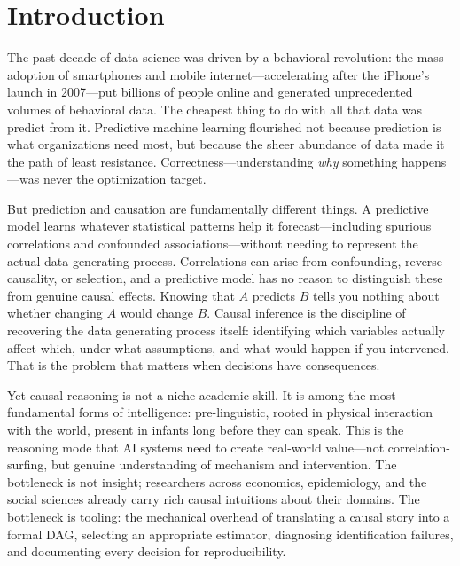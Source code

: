 \documentclass{article}
\begin{document}
\section{Introduction}
\label{sec:intro}

The past decade of data science was driven by a behavioral revolution: the mass adoption of smartphones and mobile internet---accelerating after the iPhone's launch in 2007---put billions of people online and generated unprecedented volumes of behavioral data. The cheapest thing to do with all that data was predict from it. Predictive machine learning flourished not because prediction is what organizations need most, but because the sheer abundance of data made it the path of least resistance. Correctness---understanding \emph{why} something happens---was never the optimization target.

But prediction and causation are fundamentally different things. A predictive model learns whatever statistical patterns help it forecast---including spurious correlations and confounded associations---without needing to represent the actual data generating process. Correlations can arise from confounding, reverse causality, or selection, and a predictive model has no reason to distinguish these from genuine causal effects. Knowing that $A$ predicts $B$ tells you nothing about whether changing $A$ would change $B$. Causal inference is the discipline of recovering the data generating process itself: identifying which variables actually affect which, under what assumptions, and what would happen if you intervened. That is the problem that matters when decisions have consequences.

Yet causal reasoning is not a niche academic skill. It is among the most fundamental forms of intelligence: pre-linguistic, rooted in physical interaction with the world, present in infants long before they can speak. This is the reasoning mode that AI systems need to create real-world value---not correlation-surfing, but genuine understanding of mechanism and intervention. The bottleneck is not insight; researchers across economics, epidemiology, and the social sciences already carry rich causal intuitions about their domains. The bottleneck is tooling: the mechanical overhead of translating a causal story into a formal DAG, selecting an appropriate estimator, diagnosing identification failures, and documenting every decision for reproducibility.
\end{document}
